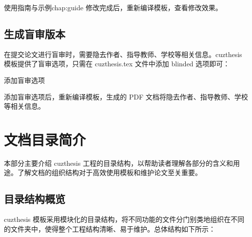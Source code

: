\begin{cuzchapter}{使用指南与示例}{chap:guide}
    修改完成后，重新编译模板，查看修改效果。

    \subsection{生成盲审版本}

    在提交论文进行盲审时，需要隐去作者、指导教师、学校等相关信息。cuzthesis 模板提供了盲审选项，只需在 cuzthesis.tex 文件中添加 blinded 选项即可：

    \begin{listing}[htbp]
        \caption{添加盲审选项}
        \label{code:blinded-option}
    \end{listing}

    添加盲审选项后，重新编译模板，生成的 PDF 文档将隐去作者、指导教师、学校等相关信息。

    \section{文档目录简介}\label{sec:directory}

    本部分主要介绍 cuzthesis 工程的目录结构，以帮助读者理解各部分的含义和用途。了解文档的组织结构对于高效使用模板和维护论文至关重要。

    \subsection{目录结构概览}\label{sub:directory-overview}

    cuzthesis 模板采用模块化的目录结构，将不同功能的文件分门别类地组织在不同的文件夹中，使得整个工程结构清晰、易于维护。总体结构如下所示：


\end{cuzchapter}

